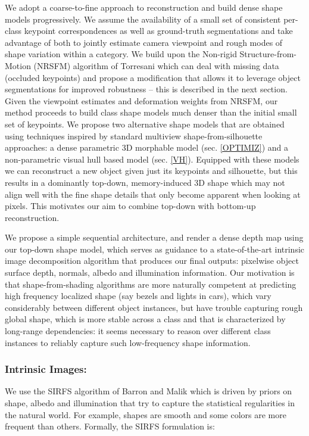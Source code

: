 We adopt a coarse-to-fine approach to reconstruction and build dense shape models progressively. We assume the availability of a small set of consistent per-class keypoint correspondences as well as ground-truth segmentations and take advantage of both to jointly estimate camera viewpoint and rough modes of shape variation within a category. We build upon the Non-rigid Structure-from-Motion (NRSFM) algorithm of Torresani \etal \cite{Torresani2008NRSFM} which can deal with missing data (occluded keypoints) and propose a modification that allows it to leverage object segmentations for improved robustness -- this is described in the next section. Given the viewpoint estimates and deformation weights from NRSFM, our method proceeds to build class shape models much denser than the initial small set of keypoints. We propose two alternative shape models that are obtained using techniques inspired by standard multiview shape-from-silhouette approaches: a dense parametric 3D morphable model (sec. \ref{OPTIMIZ}) and a non-parametric visual hull based model (sec. \ref{VH}). Equipped with these models we can reconstruct a new object given just its keypoints and silhouette, but this results in a dominantly top-down, memory-induced 3D shape which may not align well with the fine shape details that only become apparent when looking at pixels. This motivates our aim to combine top-down with bottom-up reconstruction.

We propose a simple sequential architecture, and render a dense depth map using our top-down shape model, which serves as guidance to a state-of-the-art intrinsic image decomposition algorithm that produces our final outputs: pixelwise object surface depth, normals, albedo and illumination information. Our motivation is that shape-from-shading algorithms are more naturally competent at predicting high frequency localized shape (say bezels and lights in cars), which vary considerably between different object instances, but have trouble capturing rough global shape, which is more stable across a class and that is characterized by long-range dependencies: it seems necessary to reason over different class instances to reliably capture such low-frequency shape information. 

\subsubsection{Intrinsic Images:}We use the SIRFS algorithm of Barron and Malik \cite{barronPAMI13,Barron2012B} which is driven by priors on shape, albedo and illumination that try to capture the statistical regularities in the natural world. For example, shapes are smooth and some colors are more frequent than others. Formally, the SIRFS formulation is:


